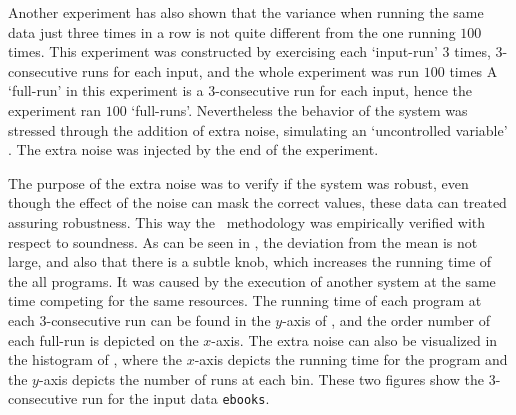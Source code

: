 Another experiment has also shown that the variance when running the same data just three times in a row is not quite different from the one running $100$ times. This experiment was constructed by exercising each `input-run' $3$ times, $3$-consecutive runs for each input, and the whole experiment was run $100$ times%
A `full-run' in this experiment is a $3$-consecutive run for each input, hence the experiment ran $100$ `full-runs'. Nevertheless the behavior of the system was stressed through the addition of extra noise, simulating an `uncontrolled variable' \cite{Kalibera2013}. The extra noise was injected by the end of the experiment.

The purpose of the extra noise was to verify if the system was robust, even though the effect of the noise can mask the correct values, these data can treated assuring robustness. This way the \CP\ methodology was empirically verified with respect to soundness. As can be seen in , the deviation from the mean is not large, and also that there is a subtle knob, which increases the running time of the all programs. It was caused by the execution of another system at the same time competing for the same resources. The running time of each program at each 3-consecutive run can be found in the $y$-axis of , and the order number of each full-run is depicted on the $x$-axis. The extra noise can also be visualized in the histogram of , where the $x$-axis depicts the running time for the program and the $y$-axis depicts the number of runs at each bin. These two figures show the $3$-consecutive run for the input data {\tt ebooks}.

